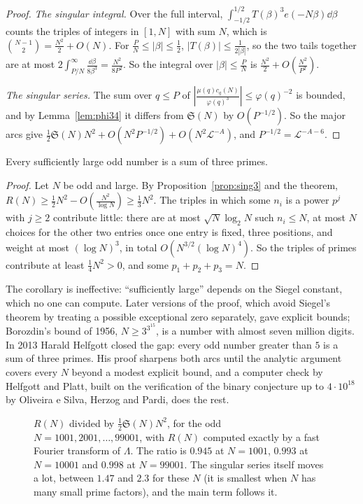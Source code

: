 \begin{proof}
\emph{The singular integral.} Over the full interval, $\int_{-1/2}^{1/2}T(\beta)^3e(-N\beta)\dd\beta$ counts the triples of integers in $[1,N]$ with sum $N$, which is $\binom{N-1}2=\frac{N^2}2+O(N)$. For $\frac PN\le|\beta|\le\frac12$, $|T(\beta)|\le\frac1{2|\beta|}$, so the two tails together are at most $2\int_{P/N}^\infty\frac{\dd\beta}{8\beta^3}=\frac{N^2}{8P^2}$. So the integral over $|\beta|\le\frac PN$ is $\frac{N^2}2+O(\frac{N^2}{P^2})$.

\emph{The singular series.} The sum over $q\le P$ of $|\frac{\mu(q)c_q(N)}{\varphi(q)^3}|\le\varphi(q)^{-2}$ is bounded, and by Lemma~\ref{lem:phi34} it differs from $\mathfrak S(N)$ by $O(P^{-1/2})$. So the major arcs give $\frac12\mathfrak S(N)N^2+O(N^2P^{-1/2})+O(N^2\mathcal L^{-A})$, and $P^{-1/2}=\mathcal L^{-A-6}$.
\end{proof}

\begin{corollary}[Vinogradov, 1937]\label{cor:threeprimes}
Every sufficiently large odd number is a sum of three primes.
\end{corollary}
\begin{proof}
Let $N$ be odd and large. By Proposition~\ref{prop:sing3} and the theorem, $R(N)\ge\frac12N^2-O(\frac{N^2}{\log N})\ge\frac13N^2$. The triples in which some $n_i$ is a power $p^j$ with $j\ge2$ contribute little: there are at most $\sqrt N\log_2N$ such $n_i\le N$, at most $N$ choices for the other two entries once one entry is fixed, three positions, and weight at most $(\log N)^3$, in total $O(N^{3/2}(\log N)^4)$. So the triples of primes contribute at least $\frac14N^2>0$, and some $p_1+p_2+p_3=N$.
\end{proof}

The corollary is ineffective: ``sufficiently large'' depends on the Siegel constant, which no one can compute. Later versions of the proof, which avoid Siegel's theorem by treating a possible exceptional zero separately, gave explicit bounds; Borozdin's bound of 1956, $N\ge3^{3^{15}}$, is a number with almost seven million digits. In 2013 Harald Helfgott closed the gap: every odd number greater than $5$ is a sum of three primes. His proof sharpens both arcs until the analytic argument covers every $N$ beyond a modest explicit bound, and a computer check by Helfgott and Platt, built on the verification of the binary conjecture up to $4\cdot10^{18}$ by Oliveira e Silva, Herzog and Pardi, does the rest.

\begin{figure}[ht]
\centering
{}
\caption{$R(N)$ divided by $\frac12\mathfrak S(N)N^2$, for the odd $N=1001,2001,\dots,99001$, with $R(N)$ computed exactly by a fast Fourier transform of $\Lambda$. The ratio is $0.945$ at $N=1001$, $0.993$ at $N=10001$ and $0.998$ at $N=99001$. The singular series itself moves a lot, between $1.47$ and $2.3$ for these $N$ (it is smallest when $N$ has many small prime factors), and the main term follows it.}
\label{fig:threeprimes}
\end{figure}

